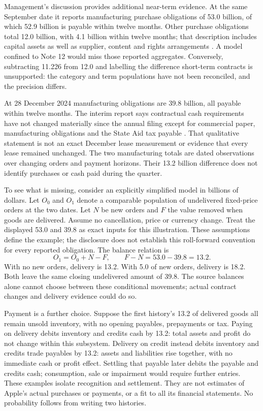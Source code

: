 Management's discussion provides additional near-term evidence. At the same
September date it reports manufacturing purchase obligations of 53.0 billion,
of which 52.9 billion is payable within twelve months. Other purchase
obligations total 12.0 billion, with 4.1 billion within twelve months; that
description includes capital assets as well as supplier, content and rights
arrangements \citep[printed p.~25]{apple2024}. A model confined to Note 12
would miss those reported aggregates. Conversely, subtracting 11.226 from 12.0
and labelling the difference short-term contracts is unsupported: the category
and term populations have not been reconciled, and the precision differs.

At 28 December 2024 manufacturing obligations are 39.8 billion, all payable
within twelve months. The interim report says contractual cash requirements
have not changed materially since the annual filing except for commercial
paper, manufacturing obligations and the State Aid tax payable
\citep[printed p.~16]{apple2025q1}. That qualitative statement is not an exact
December lease measurement or evidence that every lease remained unchanged.
The two manufacturing totals are dated observations over changing orders and
payment horizons. Their 13.2 billion difference does not identify purchases
or cash paid during the quarter.

To see what is missing, consider an explicitly simplified model in billions
of dollars. Let $O_0$ and $O_1$ denote a comparable population of undelivered
fixed-price orders at the two dates. Let $N$ be new orders and $F$ the value
removed when goods are delivered. Assume no cancellation, price or currency
change. Treat the displayed 53.0 and 39.8 as exact inputs for this illustration.
These assumptions define the example; the disclosure does not establish this
roll-forward convention for every reported obligation. The balance relation is
\begin{equation}
 O_1=O_0+N-F,\qquad F-N=53.0-39.8=13.2.
 \label{eq:apple-commitment-movement}
\end{equation}
With no new orders, delivery is 13.2. With 5.0 of new orders, delivery is 18.2.
Both leave the same closing undelivered amount of 39.8. The source balances
alone cannot choose between these conditional movements; actual contract
changes and delivery evidence could do so.

Payment is a further choice. Suppose the first history's 13.2 of delivered
goods all remain unsold inventory, with no opening payables, prepayments or tax.
Paying on delivery debits inventory and credits cash by 13.2: total assets and
profit do not change within this subsystem. Delivery on credit instead debits
inventory and credits trade payables by 13.2: assets and liabilities rise
together, with no immediate cash or profit effect. Settling that payable later
debits the payable and credits cash; consumption, sale or impairment would
require further entries. These examples isolate recognition and settlement.
They are not estimates of Apple's actual purchases or payments, or a fit to
all its financial statements. No probability follows from writing two histories.

